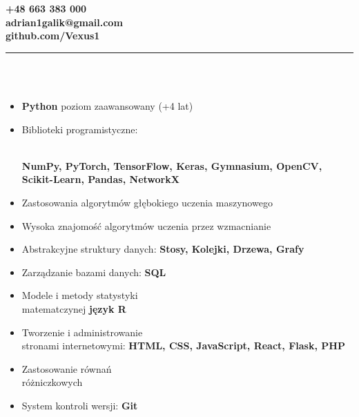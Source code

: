 \documentclass[10pt]{article}
\begin{document}
\begin{paracol}{2}
\begin{leftcolumn}
    \vspace*{-2ex} %
    \noindent \textbf{+48 663 383 000 \\
    adrian1galik@gmail.com \\
    github.com/Vexus1} \\
    \rule{6cm}{1pt} \\ \\
    \fontsize{10pt}{10pt}
    \begin{itemize}[leftmargin=*]
        \setlength{\parskip}{0pt}
        \item \textbf{Python} poziom zaawansowany (+4 lat)
        \item Biblioteki programistyczne: \raggedright \\ \textbf{NumPy, PyTorch, TensorFlow, Keras, Gymnasium, OpenCV, Scikit-Learn, Pandas, NetworkX}
        \item Zastosowania algorytmów głębokiego uczenia maszynowego
        \item Wysoka znajomość algorytmów uczenia przez wzmacnianie
        \item Abstrakcyjne struktury danych: \textbf{Stosy, Kolejki, Drzewa, Grafy}
        \item Zarządzanie bazami danych: \textbf{SQL}
        \item Modele i metody statystyki \\ matematczynej \textbf{język R}
        \item Tworzenie i administrowanie \\ stronami internetowymi: \textbf{HTML, CSS, JavaScript, React, Flask, PHP}
        \item Zastosowanie równań \\ różniczkowych
        \item System kontroli wersji: \textbf{Git}

\end{itemize}
\end{leftcolumn}
\end{paracol}
\end{document}
